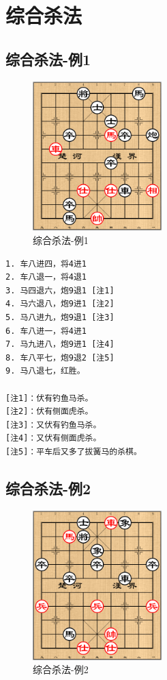 \documentclass[a5paper,twoside]{book}
\begin{document}
\chapter{综合杀法}
\label{sec-7}

\section{综合杀法-例1}
\label{sec-7-1}
\begin{figure}[H]
\centering
\includegraphics[width=5cm]{pic/综合杀法-例1.png}
\caption{综合杀法-例1}
\end{figure}

\begin{verbatim}
1. 车八进四，将4进1
2. 车八退一，将4退1
3. 马四退六，炮9退1 [注1]
4. 马六退八，炮9进1 [注2]
5. 马八进九，炮9退1 [注3]
6. 车八进一，将4进1
7. 马九进八，炮9进1 [注4]
8. 车八平七，炮9退2 [注5]
9. 马八退七，红胜。
   
[注1]：伏有钓鱼马杀。
[注2]：伏有侧面虎杀。
[注3]：又伏有钓鱼马杀。
[注4]：又伏有侧面虎杀。
[注5]：平车后又多了拔簧马的杀棋。
\end{verbatim}

\section{综合杀法-例2}
\label{sec-7-2}
\begin{figure}[H]
\centering
\includegraphics[width=5cm]{pic/综合杀法-例2.png}
\caption{综合杀法-例2}
\end{figure}
\end{document}
